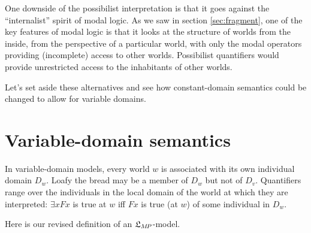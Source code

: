 

One  downside of the possibilist interpretation is that it goes against the
``internalist'' spirit of modal logic. As we saw in section \ref{sec:fragment},
one of the key features of modal logic is that it looks at the structure of
worlds from the inside, from the perspective of a particular world, with only
the modal operators providing (incomplete) access to other worlds.  Possibilist
quantifiers would provide unrestricted access to the inhabitants of other
worlds.

Let's set aside these alternatives and see how constant-domain semantics could
be changed to allow for variable domains.

\section{Variable-domain semantics}\label{sec:variabledomains}

In variable-domain models, every world $w$ is associated with its own individual
domain $D_w$. Loafy the bread may be a member of $D_w$ but not of $D_v$.
Quantifiers range over the individuals in the local domain of the world at which
they are interpreted: $\exists x Fx$ is true at $w$ iff $Fx$ is true (at $w$) of
some individual in $D_w$.

Here is our revised definition of an $\mathfrak{L}_{M\!P}$-model.

